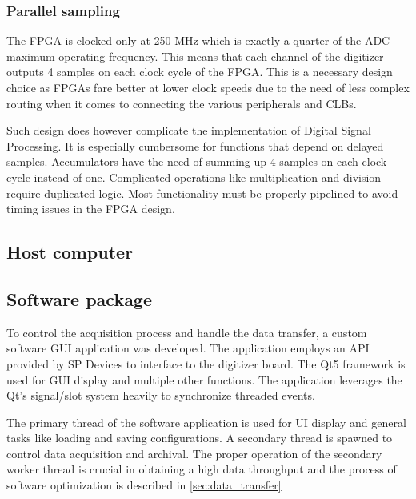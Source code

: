 \subsubsection{Parallel sampling}

The FPGA is clocked only at 250 MHz which is exactly a quarter of 
the ADC maximum operating frequency. This means that each channel
of the digitizer outputs 4 samples on each clock cycle of the 
FPGA. This is a necessary design choice as FPGAs fare better 
at lower clock speeds due to the need of less complex routing
when it comes to connecting the various peripherals and CLBs.


Such design does however complicate the implementation of 
Digital Signal Processing. It is especially cumbersome for 
functions that depend on delayed samples.
Accumulators have the need of summing up 4 samples on
each clock cycle instead of one. Complicated operations
like multiplication and division require duplicated logic.
Most functionality must be properly pipelined to avoid
timing issues in the FPGA design.

\subsection{Host computer}
\subsection{Software package}
To control the acquisition process and handle the data transfer,
a custom software GUI application was developed. The application
employs an API provided by SP Devices to interface to the digitizer board.
The Qt5 framework is used for GUI display and multiple other functions.
The application leverages the Qt's signal/slot system heavily to synchronize
threaded events.


The primary thread of the software application
is used for UI display and general tasks like 
loading and saving configurations. A secondary thread
is spawned to control data acquisition and archival.
The proper operation of the secondary worker thread
is crucial in obtaining a high data throughput and 
the process of software optimization is described in 
\autoref{sec:data_transfer}

